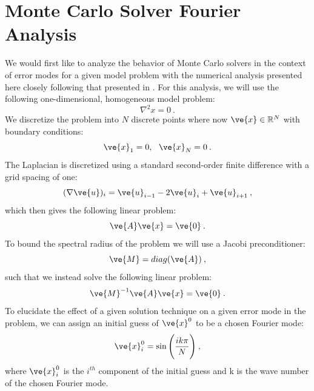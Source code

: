 \documentclass[note]{TechNote}
\begin{document}
\section{Monte Carlo Solver Fourier Analysis}
\label{sec:fourier_analysis}
We would first like to analyze the behavior of Monte Carlo solvers in
the context of error modes for a given model problem with the
numerical analysis presented here closely following that presented in
\cite{briggs_multigrid}. For this analysis, we will use the following
one-dimensional, homogeneous model problem:
\begin{equation}
  \nabla^2 x = 0\:.
  \label{eq:model_problem}
\end{equation}
We discretize the problem into $N$ discrete points
where now $\ve{x} \in \mathbb{R}^N$ with boundary conditions:
\begin{equation}
  \ve{x}_1 = 0,\ \ \ve{x}_N = 0\:.
  \label{eq:boundary_conditions}
\end{equation}
The Laplacian is discretized using a standard second-order finite
difference with a grid spacing of one:
\begin{equation}
  (\nabla \ve{u})_i = \ve{u}_{i-1} - 2 \ve{u}_{i} + \ve{u}_{i+1}\:,
  \label{eq:discrete_laplacian}
\end{equation}
which then gives the following linear problem:
\begin{equation}
  \ve{A}\ve{x} = \ve{0}\:.
  \label{eq:linear_problem}
\end{equation}
To bound the spectral radius of the problem we will use a Jacobi
preconditioner:
\begin{equation}
  \ve{M} = diag(\ve{A})\:,
  \label{eq:preconditioner}
\end{equation}
such that we instead solve the following linear problem:
\begin{equation}
  \ve{M}^{-1}\ve{A}\ve{x} = \ve{0}\:.
  \label{eq:precond_problem}
\end{equation}
To elucidate the effect of a given solution technique on a given error
mode in the problem, we can assign an initial guess of $\ve{x}^0$ to
be a chosen Fourier mode:
\begin{equation}
  \ve{x}^0_i = \sin\Bigg( \frac{ik\pi}{N} \Bigg)\:,
  \label{eq:fourier_mode}
\end{equation}
where $\ve{x}^0_i$ is the $i^{th}$ component of the initial guess and
k is the wave number of the chosen Fourier mode. 
\end{document}
